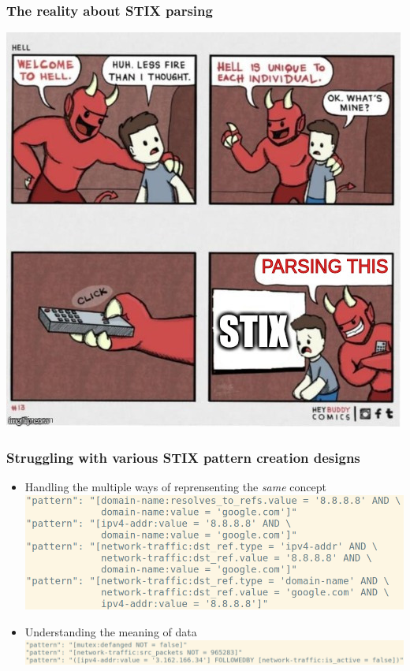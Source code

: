 \begin{frame}
    \frametitle{The reality about STIX parsing}
    \centering
    \includegraphics[scale=0.45]{images/hell.png}
\end{frame}

\begin{frame}
    \frametitle{Struggling with various STIX pattern creation designs}
    \begin{itemize}
        \item Handling the multiple ways of reprensenting the \emph{same} concept
        \includegraphics[scale=0.3]{images/pattern1.png}
        \item Understanding the meaning of data
        \includegraphics[scale=0.3]{images/pattern2.png}
    \end{itemize}
\end{frame}

